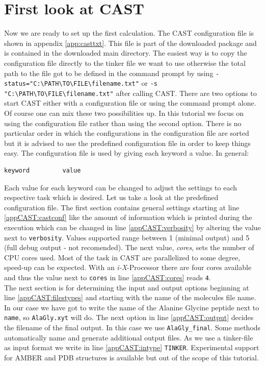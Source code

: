\documentclass[a4paper,11pt]{scrartcl}
\begin{document}
\section{First look at CAST}
\label{sec:firstlook}

Now we are ready to set up the first calculation. The CAST configuration file is shown in appendix \ref{app:casttxt}. This file is part of the downloaded package and is contained in the downloaded main directory. The easiest way is to copy the configuration file directly to the tinker file we want to use otherwise the total path to the file got to be defined in the command prompt by using \texttt{-status="C:\textbackslash{}PATH\textbackslash{}TO\textbackslash{}FILE\textbackslash{}filename.txt"} or \texttt{-s "C:\textbackslash{}PATH\textbackslash{}TO\textbackslash{}FILE\textbackslash{}filename.txt"} after calling CAST. There are two options to start CAST either with a configuration file or using the command prompt alone. Of course one can mix these two possibilities up. In this tutorial we focus on using the configuration file rather than using the second option. There is no particular order in which the configurations in the configuration file are sorted but it is advised to use the predefined configuration file in order to keep things easy. The configuration file is used by giving each keyword a value. In general:

\begin{lstlisting}[frame=single,]
	keyword			value
\end{lstlisting}

Each value for each keyword can be changed to adjust the settings to each respective task which is desired. Let us take a look at the predefined configuration file. The first section contains general settings starting at line \ref{appCAST:castconf} like the amount of information which is printed during the execution which can be changed in line \ref{appCAST:verbosity} by altering the value next to \texttt{verbosity}. Values supported range between 1 (minimal output) and 5 (full debug output - not recomended). The next value, \textit{cores}, sets the number of CPU cores used. Most of the task in CAST are parallelized to some degree, speed-up can be expected. With an \textit{i-X}-Processor there are four cores available and thus the value next to \texttt{cores} in line \ref{appCAST:cores} reads \texttt{4}.\\
The next section is for determining the input and output options beginning at line \ref{appCAST:filestypes} and starting with the name of the molecules file name. In our case we have got to write the name of the Alanine Glycine peptide next to \texttt{name}, so \texttt{AlaGly.xyt} will do. The next option in line \ref{appCAST:output} decides the filename of the final output. In this case we use \texttt{AlaGly\_final}. Some methods automatically name and generate additional output files. As we use a tinker-file as input format we write in line \ref{appCAST:intype} \texttt{TINKER}. Experimental support for AMBER and PDB structures is available but out of the scope of this tutorial. %
\end{document}
